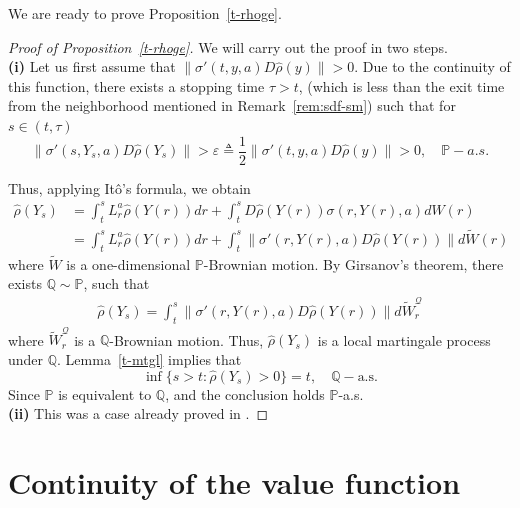 \documentclass[11pt,reqno]{amsart}
\numberwithin{equation}{section}
\newcommand{\lemref}[1]{Lemma~{\rm \ref{#1}}}
\newcommand{\propref}[1]{Proposition~{\rm \ref{#1}}}
\renewcommand{\P}{\mathbb{P}}
\begin{document}
We are ready to prove  \propref{t-rhoge}.
\begin{proof}[Proof of \propref{t-rhoge}]
 We will carry out the proof in two steps. \\
  \textbf{(i)} Let us first assume that $\|\sigma'(t,y,a) D\hat \rho(y)\|>0$. 
  Due to the continuity of this function, there exists a stopping time
  $\tau > t$, (which is less than the exit time from the neighborhood
  mentioned in Remark~\ref{rem:sdf-sm}) such that 
  for  $s\in (t,\tau)$ 
  \begin{equation}\label{eq:t-rhoge2}
    \|\sigma'(s,Y_s,a) D\hat{\rho}(Y_s)\| > \varepsilon \triangleq
    \frac 1 2 \|\sigma'(t,y,a) D\hat \rho(y)\| > 0,\quad  \P-a.s.
  \end{equation}
  
  
  Thus, applying It\^{o}'s formula, we obtain
  $$\begin{array}{ll}
    \hat \rho (Y_s) & \displaystyle = \int_t^s L_r^a \hat \rho(Y(r))
    dr + \int_t^s D \hat \rho(Y(r)) \sigma(r, Y(r),a) dW(r) \\
    & = \displaystyle \int_t^s L_r^a \hat \rho (Y(r)) dr + \int_t^s
   \|\sigma'(r,Y(r),a) D\hat \rho(Y(r))\| d\widetilde{W}(r) 
  \end{array}$$
  where $\widetilde{W}$ is a one-dimensional $\P$-Brownian motion.
By Girsanov's theorem, there exists  $\mathbb{Q} \sim \P$,
  such that 
  $$\begin{array}{ll}
    \hat \rho (Y_s) \displaystyle = \int_t^s \|\sigma'(r, Y(r),a) D\hat
    \rho(Y(r))\| d \widetilde{W}_r^{\mathcal{Q}}  
  \end{array}$$
  where $\widetilde{W}_r^{\mathcal{Q}}  $ is a $\mathbb{Q}$-Brownian
  motion. Thus, $\hat \rho(Y_s)$ is a local martingale process under
  $\mathbb{Q}$.  \lemref{t-mtgl} implies that
  \begin{equation*}
    \inf\{s>t: \hat \rho(Y_s)>0 \} = t, \quad \mathbb{Q}-\text{a.s.}
  \end{equation*}
  Since $\P$ is equivalent to $\mathbb{Q}$, and the conclusion holds
  $\P$-a.s. \\ 

\noindent \textbf{(ii)} This was a case already proved in \cite[Lemma
V.2.1]{FS06}. 
\end{proof}

\section{Continuity of the value function} \label{sec:ctn}
\end{document}
